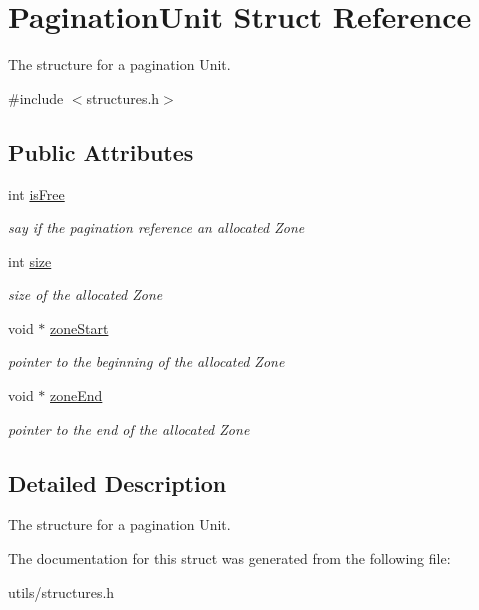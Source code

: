 \hypertarget{structPaginationUnit}{}\section{Pagination\+Unit Struct Reference}
\label{structPaginationUnit}


The structure for a pagination Unit.  




{\ttfamily \#include $<$structures.\+h$>$}

\subsection*{Public Attributes}
\begin{DoxyCompactItemize}
\item 
\mbox{\label{structPaginationUnit_a49ee506112f8f9312df1559ed19db153}} 
int \hyperlink{structPaginationUnit_a49ee506112f8f9312df1559ed19db153}{is\+Free}
\begin{DoxyCompactList}\small\item\em say if the pagination reference an allocated Zone \end{DoxyCompactList}\item 
\mbox{\label{structPaginationUnit_a7b8f88cdc323227eae2dd8438ebfd063}} 
int \hyperlink{structPaginationUnit_a7b8f88cdc323227eae2dd8438ebfd063}{size}
\begin{DoxyCompactList}\small\item\em size of the allocated Zone \end{DoxyCompactList}\item 
\mbox{\label{structPaginationUnit_ad6188b221501c30dfe236902f2b4e044}} 
void $\ast$ \hyperlink{structPaginationUnit_ad6188b221501c30dfe236902f2b4e044}{zone\+Start}
\begin{DoxyCompactList}\small\item\em pointer to the beginning of the allocated Zone \end{DoxyCompactList}\item 
\mbox{\label{structPaginationUnit_a4c06b5b49fcc57f23808a8e5a3e5f394}} 
void $\ast$ \hyperlink{structPaginationUnit_a4c06b5b49fcc57f23808a8e5a3e5f394}{zone\+End}
\begin{DoxyCompactList}\small\item\em pointer to the end of the allocated Zone \end{DoxyCompactList}\end{DoxyCompactItemize}


\subsection{Detailed Description}
The structure for a pagination Unit. 

The documentation for this struct was generated from the following file\+:\begin{DoxyCompactItemize}
\item 
utils/structures.\+h\end{DoxyCompactItemize}
